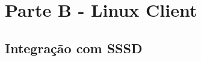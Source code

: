 
\chapter[Parte B - Linux Client]{Parte B - Linux Client}

\section[Integração com SSSD]{Integração com SSSD}

